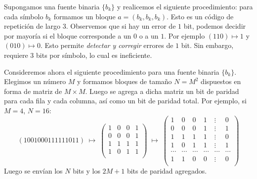\begin{ejemplo}\label{ej:codrep}
    Supongamos una fuente binaria $\{b_k\}$ y realicemos el siguiente procedimiento: para cada símbolo $b_k$ formamos un bloque $a=(b_k, b_k, b_k)$. Esto es un código de repetición de largo $3$. Observemos que si hay un error de $1$ bit, podemos decidir por mayoría si el bloque corresponde a un $0$ o a un $1$. Por ejemplo $(110)\mapsto 1$ y $(010)\mapsto 0$. Esto permite \emph{detectar y corregir} errores de $1$ bit. Sin embargo, requiere 3 bits por símbolo, lo cual es ineficiente.
\end{ejemplo}

\begin{ejemplo}\label{ej:parity matrix}
    Consideremos ahora el siguiente procedimiento para una fuente binaria $\{b_k\}$. Elegimos un número $M$ y formamos bloques de tamaño $N=M^2$ dispuestos en forma de matriz de $M\times M$. Luego se agrega a dicha matriz un bit de paridad para cada fila y cada columna, así como un bit de paridad total. Por ejemplo, si $M=4$, $N=16$:
    \begin{equation*}
        (1001000111111011) \; \mapsto\; \begin{pmatrix}
            1 & 0 & 0 & 1 \\
            0 & 0 & 0 & 1 \\
            1 & 1 & 1 & 1 \\
            1 & 0 & 1 & 1 \\
        \end{pmatrix} \; \mapsto \; \begin{pmatrix}
            1 & 0 & 0 & 1 & \vdots & 0 \\
            0 & 0 & 0 & 1 & \vdots & 1 \\
            1 & 1 & 1 & 1 & \vdots & 0 \\
            1 & 0 & 1 & 1 & \vdots & 1 \\
            \cdots & \cdots & \cdots & \cdots & \cdots & \cdots \\
            1 & 1 & 0 & 0 & \vdots & 0 \\
        \end{pmatrix}
    \end{equation*}
    Luego se envían los $N$ bits y los $2M+1$ bits de paridad agregados.


\end{ejemplo}

